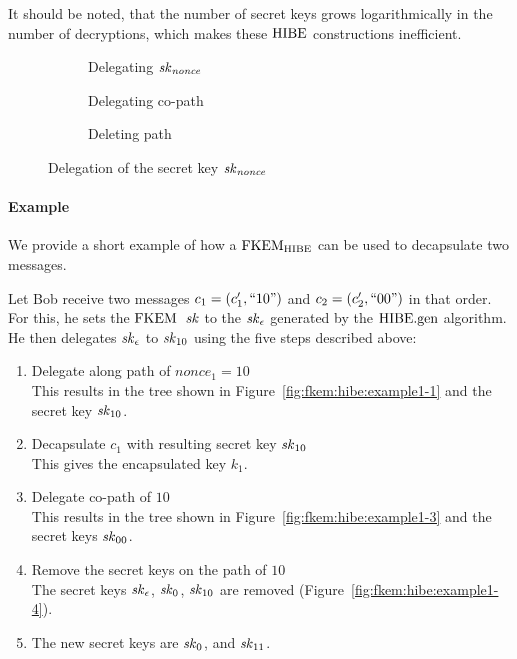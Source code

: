 It should be noted, that the number of secret keys grows logarithmically in the number of decryptions, which makes these $\mathrm{HIBE}$ constructions inefficient. 

\begin{figure}[!ht]
    \centering
    \begin{subfigure}{.33\textwidth}
        \centering
        
        \caption{Delegating $\mathit{sk}_\mathit{nonce}$}
        \label{fig:fkem:hibe:delegation1}
    \end{subfigure}\hfill
    \begin{subfigure}{.33\textwidth}
        \centering
        
        \caption{Delegating co-path}
        \label{fig:fkem:hibe:delegation3}
    \end{subfigure}\hfill
    \begin{subfigure}{.33\textwidth}
        \centering
        
        \caption{Deleting path}
        \label{fig:fkem:hibe:delegation4}
    \end{subfigure}
    \caption{Delegation of the secret key $\mathit{sk}_{\mathit{nonce}}$}
    \label{fig:fkem:hibe:delegation}
\end{figure}

\paragraph{Example} We provide a short example of how a $\mathrm{FKEM}_{\mathrm{HIBE}}$ can be used to decapsulate two messages.

Let Bob receive two messages $c_1=(c_1',``10")$ and $c_2=(c_2',``00")$ in that order.
For this, he sets the $\mathrm{FKEM}$~$\mathit{sk}$ to the $\mathit{sk}_\epsilon$ generated by the $\mathrm{HIBE}.\mathrm{gen}$ algorithm.
He then delegates $\mathit{sk}_\epsilon$ to $\mathit{sk}_{10}$ using the five steps described above:
\begin{enumerate}
    \item Delegate along path of $\mathit{nonce}_1=10$\\
        This results in the tree shown in Figure~\ref{fig:fkem:hibe:example1-1} and the secret key $\mathit{sk}_{10}$.
    \item Decapsulate $c_1$ with resulting secret key $\mathit{sk}_{10}$\\
        This gives the encapsulated key $k_1$.
    \item Delegate co-path of $10$\\
        This results in the tree shown in Figure~\ref{fig:fkem:hibe:example1-3} and the secret keys $\mathit{sk}_{00}$.
    \item Remove the secret keys on the path of $10$\\
        The secret keys $\mathit{sk}_\epsilon$, $\mathit{sk}_0$, $\mathit{sk}_{10}$ are removed (Figure~\ref{fig:fkem:hibe:example1-4}).
    \item The new secret keys are $\mathit{sk}_0$, and $\mathit{sk}_{11}$.
\end{enumerate}

